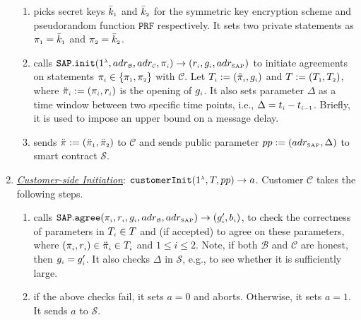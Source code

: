 \begin{enumerate}[leftmargin=.46cm]
\begin{enumerate}
\item\label{RCPoRP::setup} picks   secret keys $\bar k_{\scriptscriptstyle 1}$ and $\bar k_{\scriptscriptstyle 2}$ for the symmetric key encryption scheme and  pseudorandom function $\mathtt{PRF}$ respectively. It  sets two private statements as $\pi_{\scriptscriptstyle 1}=\bar k_{\scriptscriptstyle 1}$ and $\pi_{\scriptscriptstyle 2}= \bar k_{\scriptscriptstyle 2}$.
%
\item\label{RCPoRP::set-qp}  calls $\mathtt{SAP.init}(1^{\scriptscriptstyle\lambda}, adr_{\scriptscriptstyle\mathcal{B}}, adr_{\scriptscriptstyle\mathcal{C}}, \pi_{\scriptscriptstyle i})\rightarrow(r_{
\scriptscriptstyle i}, g_{\scriptscriptstyle i}, adr_{\scriptscriptstyle\text{SAP}})$ to initiate  agreements on  statements $\pi_{\scriptscriptstyle i}\in \{\pi_{\scriptscriptstyle 1}, \pi_{\scriptscriptstyle 2}\}$  with  $\mathcal{C}$.  Let $T_{\scriptscriptstyle i}:=(\ddot{\pi}_{\scriptscriptstyle i}, g_{\scriptscriptstyle i})$ and $T:=(T_{\scriptscriptstyle 1}, T_{\scriptscriptstyle 2})$,  where  $\ddot{\pi}_{\scriptscriptstyle i}:=(\pi_{\scriptscriptstyle i}, r_{\scriptscriptstyle i})$ is the opening of $g_{\scriptscriptstyle i}$.  It also sets parameter $\Delta$ as a time window between two specific time points, i.e., $\Delta=t_{\scriptscriptstyle i} - t_{\scriptscriptstyle i-1}$. Briefly, it is used to impose an upper bound on a message delay.  %
%
\item sends $\ddot{\pi}:=(\ddot{\pi}_{\scriptscriptstyle 1}, \ddot{\pi}_{\scriptscriptstyle 2})$ to   $\mathcal{C}$ and   sends  public parameter $pp:=(adr_{\scriptscriptstyle\text{SAP}},\Delta)$ to  smart contract $\mathcal{S}$.
%
\end{enumerate}


\item  \underline{\textit{Customer-side Initiation}}\label{customer-side-Initiation}: $\mathtt{customerInit} (1^{\scriptscriptstyle \lambda}, T, pp)\rightarrow a$.
%
Customer $\mathcal{C}$ takes the following steps. 

\begin{enumerate}
%
\item\label{customer-side-Initiation-SAP-agree} calls   $\mathtt{SAP.agree}(\pi_{\scriptscriptstyle i}, r_{\scriptscriptstyle i}, g_{\scriptscriptstyle i}, adr_{\scriptscriptstyle\mathcal{B}}, adr_{\scriptscriptstyle\text{SAP}})\rightarrow (g'_{\scriptscriptstyle i}, b_{\scriptscriptstyle i})$, to check the correctness of parameters in $T_{\scriptscriptstyle i}\in T$ and (if accepted) to agree on these parameters, where $(\pi_{\scriptscriptstyle i}, r_{\scriptscriptstyle i}) \in \ddot{\pi}_{\scriptscriptstyle i}\in T_{\scriptscriptstyle i}$ and $1\leq i \leq 2$. Note,  if both $\mathcal{B}$ and $\mathcal{C}$ are honest, then $g_{\scriptscriptstyle i}=g'_{\scriptscriptstyle i}$. It also checks $\Delta$ in  $\mathcal{S}$, e.g., to see whether it is sufficiently large.
%
\item if the above checks fail,  it sets $a=0$ and aborts. Otherwise, it sets $a=1$. It sends $a$ to $\mathcal{S}$. 
\end{enumerate}
%


\end{enumerate}
